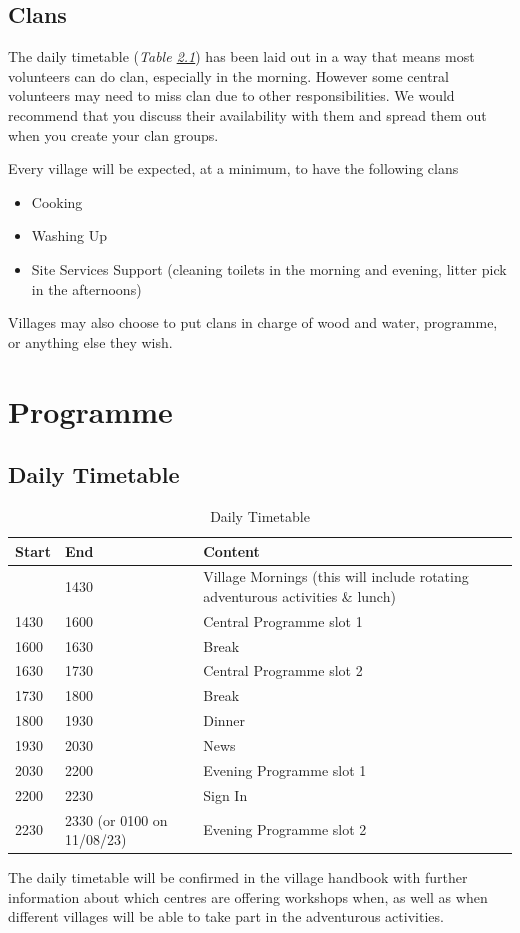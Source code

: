 \documentclass[a4paper, 11pt]{report}
\newcommand{\nl}{\newline}
\begin{document}
\section{Clans}
The daily timetable (\textit{Table \ref*{tab:daily-timetable}}) has been laid out in a way that means most volunteers can do clan, especially in the morning. However some central volunteers may need to miss clan due to other responsibilities. We would recommend that you discuss their availability with them and spread them out when you create your clan groups. \nl

Every village will be expected, at a minimum, to have the following clans
\begin{itemize}
    \item Cooking
    \item Washing Up
    \item Site Services Support (cleaning toilets in the morning and evening, litter pick in the afternoons)   
\end{itemize}
Villages may also choose to put clans in charge of wood and water, programme, or anything else they wish. 


\chapter{Programme}
\section{Daily Timetable}
\begin{table}[H]
    \label{tab:daily-timetable}
    \centering
    \begin{tabular}{p{} p{} p{}}
        \textbf{Start} & \textbf{End} & \textbf{Content}\\
        \hline
         & 1430 & Village Mornings (this will include rotating adventurous activities \& lunch) \\
        \hline
        1430 & 1600 & Central Programme slot 1 \\
        \hline
        1600 & 1630 & Break \\
        \hline
        1630 & 1730 & Central Programme slot 2 \\
        \hline
        1730 & 1800 & Break \\
        \hline
        1800 & 1930 & Dinner \\
        \hline
        1930 & 2030 & News \\
        \hline
        2030 & 2200 & Evening Programme slot 1 \\
        \hline
        2200 & 2230 & Sign In \\
        \hline
        2230 & 2330 (or 0100 on 11/08/23) & Evening Programme slot 2 \\
        \hline
    \end{tabular}
    \caption{Daily Timetable}
\end{table}
The daily timetable will be confirmed in the village handbook with further information about which centres are offering workshops when, as well as when different villages will be able to take part in the adventurous activities. 
\end{document}
